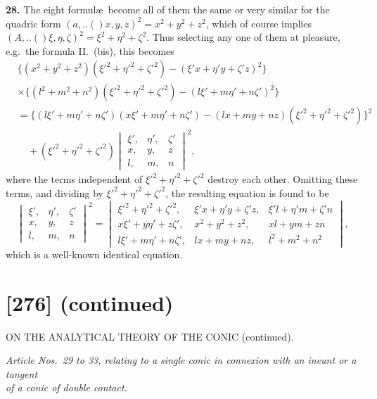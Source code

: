 \documentclass[11pt,a4paper]{book}
\providecommand{\qform}[1]{(#1)}
\begin{document}
\textbf{28.} The eight formul\ae\ become all of them the same or very similar for the quadric form $(a,..\!\qform{}{x, y, z})^{2} = x^{2} + y^{2} + z^{2}$, which of course implies $(A,..\!\qform{}{\xi, \eta, \zeta})^{2} = \xi^{2} + \eta^{2} + \zeta^{2}$. Thus selecting any one of them at pleasure, e.g.\ the formula II.\ (bis), this becomes
\begin{align*}
&\{(x^{2} + y^{2} + z^{2})(\xi'^{2} + \eta'^{2} + \zeta'^{2}) - (\xi'x + \eta'y + \zeta'z)^{2}\}\\
&\times \{(l^{2} + m^{2} + n^{2})(\xi'^{2} + \eta'^{2} + \zeta'^{2}) - (l\xi' + m\eta' + n\zeta')^{2}\}\\
&= \{(l\xi' + m\eta' + n\zeta')(x\xi' + m\eta' + n\zeta') - (lx + my + nz)(\xi'^{2} + \eta'^{2} + \zeta'^{2})\}^{2}\\
&\quad + (\xi'^{2} + \eta'^{2} + \zeta'^{2})
\begin{vmatrix}
\xi', & \eta', & \zeta' \\
x, & y, & z \\
l, & m, & n
\end{vmatrix}^{2},
\end{align*}
where the terms independent of $\xi'^{2} + \eta'^{2} + \zeta'^{2}$ destroy each other. Omitting these terms, and dividing by $\xi'^{2} + \eta'^{2} + \zeta'^{2}$, the resulting equation is found to be
\[
\begin{vmatrix}
\xi', & \eta', & \zeta' \\
x, & y, & z \\
l, & m, & n
\end{vmatrix}^{2}
=
\begin{vmatrix}
\xi'^{2} + \eta'^{2} + \zeta'^{2}, & \xi'x + \eta'y + \zeta'z, & \xi'l + \eta'm + \zeta'n \\
x\xi' + y\eta' + z\zeta', & x^{2} + y^{2} + z^{2}, & xl + ym + zn \\
l\xi' + m\eta' + n\zeta', & lx + my + nz, & l^{2} + m^{2} + n^{2}
\end{vmatrix},
\]
which is a well-known identical equation.

\newpage
\section*{[276] (continued)}
\begin{center}
{\large ON THE ANALYTICAL THEORY OF THE CONIC (continued).}
\end{center}

\medskip
\begin{center}
\textit{Article Nos.\ 29 to 33, relating to a single conic in connexion with an ineunt or a tangent\\of a conic of double contact.}
\end{center}
\medskip
\end{document}
